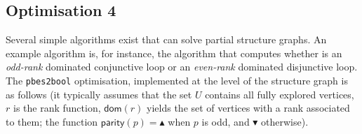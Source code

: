 \documentclass{article}
\newcommand{\up}{\blacktriangle}
\newcommand{\down}{\blacktriangledown}
\begin{document}
\subsection{Optimisation 4}
Several simple algorithms exist that can solve partial structure graphs. An example
algorithm is, for instance, the algorithm that computes whether is an
\emph{odd-rank} dominated conjunctive loop or an \emph{even-rank} dominated disjunctive loop.
The \texttt{pbes2bool} optimisation, implemented at the level of the structure graph is as
follows (it typically assumes that the set $U$ contains all fully explored vertices, $r$ is
the rank function, $\textsf{dom}(r)$ yields the set of vertices with a rank associated to
them; the function $\mathsf{parity}(p) = \up$ when $p$ is odd, and $\down$ otherwise).
\end{document}
